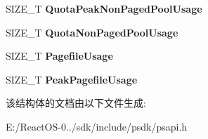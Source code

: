 \begin{DoxyCompactItemize}
\item 
\mbox{\label{struct___p_r_o_c_e_s_s___m_e_m_o_r_y___c_o_u_n_t_e_r_s_adc547933d4ef2fbce4cc88652dfaee96}} 
S\+I\+Z\+E\+\_\+T {\bfseries Quota\+Peak\+Non\+Paged\+Pool\+Usage}
\item 
\mbox{\label{struct___p_r_o_c_e_s_s___m_e_m_o_r_y___c_o_u_n_t_e_r_s_a15a1c1ec5d453b296a6c4a8901b36098}} 
S\+I\+Z\+E\+\_\+T {\bfseries Quota\+Non\+Paged\+Pool\+Usage}
\item 
\mbox{\label{struct___p_r_o_c_e_s_s___m_e_m_o_r_y___c_o_u_n_t_e_r_s_a3451d8e13ccc50c95f14c43a5bcba6a7}} 
S\+I\+Z\+E\+\_\+T {\bfseries Pagefile\+Usage}
\item 
\mbox{\label{struct___p_r_o_c_e_s_s___m_e_m_o_r_y___c_o_u_n_t_e_r_s_a0e472d1e28196c31bbdbdc2599e3c9f9}} 
S\+I\+Z\+E\+\_\+T {\bfseries Peak\+Pagefile\+Usage}
\end{DoxyCompactItemize}


该结构体的文档由以下文件生成\+:\begin{DoxyCompactItemize}
\item 
E\+:/\+React\+O\+S-\/0../sdk/include/psdk/psapi.\+h\end{DoxyCompactItemize}
